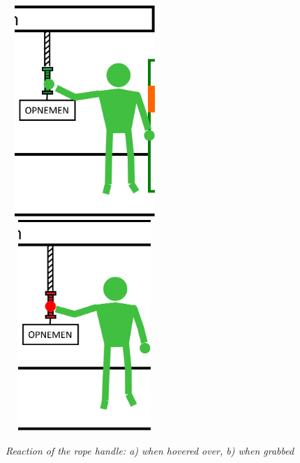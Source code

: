 \begin{figure}[H]
	\begin{center}
		\includegraphics[width=6cm, height=8cm]{figures/2_hover_over_rope.png}
		\includegraphics[width=6cm, height=8cm]{figures/3_grab_rope.png}
		\caption{\emph{Reaction of the rope handle: a) when hovered over, b) when grabbed}}
		\label{rope handle reaction}
	\end{center}
\end{figure}

